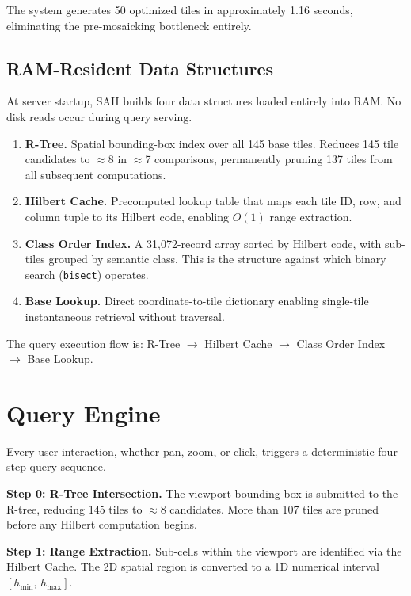 \documentclass[conference]{IEEEtran}
\begin{document}
The system generates 50 optimized tiles in approximately 1.16 seconds, eliminating the pre-mosaicking bottleneck entirely.

\subsection{RAM-Resident Data Structures}

At server startup, SAH builds four data structures loaded entirely into RAM. No disk reads occur during query serving.

\begin{enumerate}
  \item \textbf{R-Tree.} Spatial bounding-box index over all 145 base tiles.
Reduces 145 tile candidates to $\approx$8 in $\approx$7 comparisons, permanently pruning 137 tiles from all subsequent computations.
  \item \textbf{Hilbert Cache.} Precomputed lookup table that maps each
tile ID, row, and column tuple to its Hilbert code, enabling $O(1)$ range extraction.
  \item \textbf{Class Order Index.} A 31{,}072-record array sorted by Hilbert
code, with sub-tiles grouped by semantic class. This is the structure against which binary search (\texttt{bisect}) operates.
  \item \textbf{Base Lookup.} Direct coordinate-to-tile dictionary enabling
single-tile instantaneous retrieval without traversal.
\end{enumerate}

The query execution flow is: R-Tree $\to$ Hilbert Cache $\to$ Class Order Index $\to$ Base Lookup.

\section{Query Engine}

Every user interaction, whether pan, zoom, or click, triggers a deterministic four-step query sequence.

\textbf{Step 0: R-Tree Intersection.} The viewport bounding box is
submitted to the R-tree, reducing 145 tiles to $\approx$8 candidates. More than 107 tiles are pruned before any Hilbert computation begins.

\textbf{Step 1: Range Extraction.} Sub-cells within the viewport are
identified via the Hilbert Cache. The 2D spatial region is converted to a 1D numerical interval $[h_{\min},\, h_{\max}]$.
\end{document}
